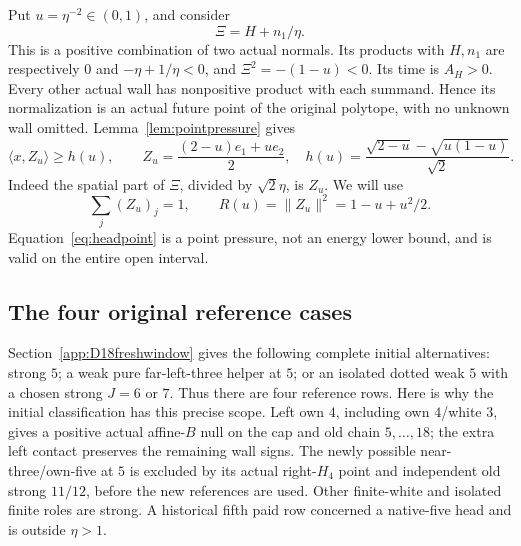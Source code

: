 \documentclass[11pt]{article}
\theoremstyle{definition}
\theoremstyle{remark}
\newcommand{\ip}[2]{\langle #1,#2\rangle}
\newcommand{\norm}[1]{\lVert #1\rVert}
\begin{document}
Put \(u=\eta^{-2}\in(0,1)\), and consider
\[
 \Xi=H+n_1/\eta.
\]
This is a positive combination of two actual normals.
Its products with \(H,n_1\) are respectively \(0\) and
\(-\eta+1/\eta<0\), and \(\Xi^2=-(1-u)<0\).
Its time is \(A_H>0\). Every other actual wall has nonpositive
product with each summand. Hence its normalization is an actual
future point of the original polytope, with no unknown wall
omitted. Lemma~\ref{lem:pointpressure} gives
\begin{equation}
\label{eq:headpoint}
 \ip{x}{Z_u}\geq h(u),\qquad
 Z_u=\frac{(2-u)e_1+u e_2}{2},\quad
 h(u)=\frac{\sqrt{2-u}-\sqrt{u(1-u)}}{\sqrt2}.
\end{equation}
Indeed the spatial part of \(\Xi\), divided by \(\sqrt2\eta\),
is \(Z_u\). We will use
\[
 \sum_j(Z_u)_j=1,\qquad R(u)=\norm{Z_u}^2=1-u+u^2/2.
\]
Equation~\eqref{eq:headpoint} is a point pressure, not an
energy lower bound, and is valid on the entire open interval.

\subsection{The four original reference cases}
\label{subsec:fourrefs}

Section~\ref{app:D18freshwindow} gives the following complete
initial alternatives: strong \(5\); a weak pure far-left-three
helper at \(5\); or an isolated dotted weak \(5\) with a chosen
strong \(J=6\) or \(7\). Thus there are four reference rows.
Here is why the initial classification has this precise scope.
Left own \(4\), including own \(4\)/white \(3\), gives a positive
actual affine-\(B\) null on the cap and old chain \(5,\ldots,18\);
the extra left contact preserves the remaining wall signs.
The newly possible near-three/own-five at \(5\) is excluded by
its actual right-\(H_4\) point and independent old strong
\(11/12\), before the new references are used. Other finite-white
and isolated finite roles are strong. A historical fifth paid
row concerned a native-five head and is outside \(\eta>1\).
\end{document}
